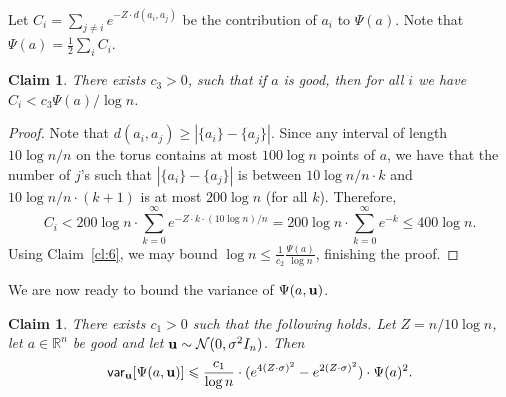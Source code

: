\documentclass[10pt,a4paper]{article}
\newtheorem{claim}[thm]{Claim}
\renewcommand\ge{\geqslant}
\renewcommand\leq{\leqslant}
\newcommand{\si}{\sigma}
\begin{document}
Let $C_i = \sum_{j\neq i} e^{-Z\cdot d(a_i,a_j)}$
be the contribution of $a_i$ to $\Psi(a)$. Note that $\Psi(a)= \frac{1}{2}\sum_i C_i$.

\begin{claim}\label{cl:7}
There exists $c_3>0$, such that if $a$ is good, then for all $i$ we have
$C_i < c_3 \Psi(a)/\log n$.
\end{claim}
\begin{proof}
	Note that $d(a_i,a_j)\ge | \{a_i\} - \{a_j\}|$. Since any interval of length $10\log n/n$ on the torus contains at most $100\log n$ points of $a$,
    we have that the number of $j$'s such that $|\{a_i\} - \{a_j\}|$ is between $10 \log n/n \cdot k$ and $10 \log n/n \cdot (k+1)$ is at most $200\log n$
    (for all $k$). Therefore,
	\[
	C_i < 200 \log n\cdot \sum_{k=0}^{\infty} e^{-Z \cdot k \cdot (10 \log n )/n} = 200 \log n \cdot \sum_{k=0}^{\infty}e^{-k}
    \leq 400 \log n.
	\]
Using Claim~\ref{cl:6}, we may bound $\log n\leq \frac{1}{c_2}\frac{\Psi(a)}{\log n}$, finishing the proof.
\end{proof}


We are now ready to bound the variance of $\Psi(a,{\bf u} )$.
\begin{claim}\label{cl:3}
There exists $c_1>0$ such that the following holds.
Let $Z= n/10\log n$, let $a\in \mathbb{R}^n$ be good and let ${\bf u} \sim \mathcal{N}(0,\sigma^2 I_n)$.
Then
\[
	{\sf var}_{\bf u} [\Psi(a,{\bf u} )] \leq \frac{c_1}{\log n} \cdot( e^{4(Z \cdot \si)^2}
	-e^{2(Z \cdot \si)^2})\cdot \Psi(a)^2.
\]
\end{claim}
\end{document}

